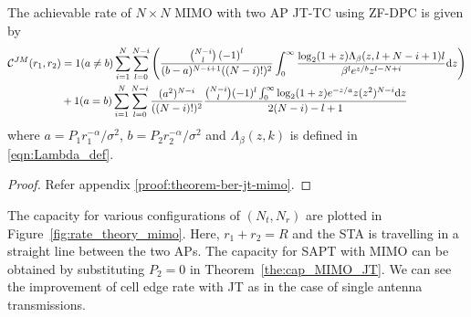 \begin{theorem}\label{the:cap_MIMO_JT}
	The achievable rate of $N\times N$ MIMO with two AP JT-TC using ZF-DPC is given by
	\begin{align}
	\mathcal{C}^{JM}(r_1,r_2)&=1(a\neq b)
	\sum_{i=1}^{N} \sum_{l=0}^{N-i} \left( \frac{{N-i \choose l}\left(-1\right)^l }{(b-a)^{N-i+1}((N-i)!)^2} 
	\int_{0}^{\infty}\frac{\log_2(1+z)\Lambda_{\beta}(z,l+N-i+1)l}{\beta^le^{z/b}z^{l-N+i}}\mathrm{d} z\right) \nonumber\\
	&+1(a= b) \sum_{i=1}^{N} \sum_{l=0}^{N-i} \frac{(a^2)^{N-i}}{((N-i)!)^2}\frac{{N-i \choose l}(-1)^{l} \int_{0}^{\infty} \log_2(1+z)e^{-z/a}z(z^2)^{N-i} \mathrm{d} z}{2(N-i)-l+1}
	\end{align}
	where $a = P_1 r_1^{-\alpha} / \sigma^2$, $b=P_2 r_2^{-\alpha} / \sigma^2$ and $\Lambda_{\beta}(z,k)$ is defined in \eqref{eqn:Lambda_def}.
\end{theorem}
\begin{proof}
	Refer appendix \ref{proof:theorem-ber-jt-mimo}.
\end{proof}

The capacity for various configurations of $(N_t,N_r)$ are plotted in Figure~\ref{fig:rate_theory_mimo}. Here, $r_1 + r_2 = R$ and the STA is travelling in a straight line between the two APs. The capacity for SAPT with MIMO can be obtained by substituting $P_2=0$ in Theorem~\ref{the:cap_MIMO_JT}.  We can see the improvement of cell edge rate with JT as in the case of single antenna transmissions. 

